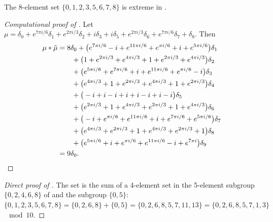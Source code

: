 


\begin{prop}\label{prop8in10} The 8-element set
$\{0,1,2,3,5,6,7,8\}$ is extreme in . %
\end{prop}


\begin{proof}[Computational proof of ] 
Let $\mu=\delta_{0}  +   e^{ 7\pi i  / 6}\delta_{1}  +   e^{ 2\pi i  / 3}\delta_{2}  +    i \delta_{3}  +    i \delta_{5}  +   e^{ 2\pi i  / 3}\delta_{6}  +   e^{ 7\pi i  / 6}\delta_{7}  +  \delta_{8} $.
Then
\begin{align*}  
\mu*\tilde\mu &=   8\delta_{0}  +  \big( e^{ 7 \pi i / 6}- i+ e^{ 11 \pi i / 6}+ e^{\pi i / 6}+  i + e^{ 5 \pi i / 6}\big)\delta_{1} 
\\& \qquad +  \big( 1+ e^{ 2 \pi i / 3}+ e^{ 4 \pi i / 3}+ 1+ e^{ 2 \pi i / 3}+ e^{ 4 \pi i / 3}\big)\delta_{2} 
\\& \qquad +  \big( e^{ 5 \pi i / 6}+ e^{ 7 \pi i / 6}+  i + e^{ 11 \pi i / 6}+ e^{\pi i / 6}- i\big)\delta_{3} 
\\& \qquad +  \big( e^{ 4 \pi i / 3}+ 1+ e^{ 2 \pi i / 3}+ e^{ 4 \pi i / 3}+ 1+ e^{ 2 \pi i / 3}\big)\delta_{4} 
\\& \qquad +  \big( -i +  i - i+  i +  i - i+  i - i\big)\delta_{5} 
\\& \qquad +  \big( e^{ 2 \pi i / 3}+ 1+ e^{ 4 \pi i / 3}+ e^{ 2 \pi i / 3}+ 1+ e^{ 4 \pi i / 3}\big)\delta_{6} 
\\& \qquad +  \big( -i + e^{\pi i / 6}+ e^{ 11 \pi i / 6}+  i + e^{ 7 \pi i / 6}+ e^{ 5 \pi i / 6}\big)\delta_{7} 
\\& \qquad +  \big( e^{ 4 \pi i / 3}+ e^{ 2 \pi i / 3}+ 1+ e^{ 4 \pi i / 3}+ e^{ 2 \pi i / 3}+ 1\big)\delta_{8} 
\\& \qquad +  \big( e^{ 5 \pi i / 6}+  i + e^{\pi i / 6}+ e^{ 11 \pi i / 6}- i+ e^{ 7 \pi i }\big)\delta_{9}
\\&=9\delta_0.\qedhere
\end{align*}
\end{proof}


\begin{proof}[Direct proof of ] The set is the sum of a 4-element set in the 5-element
subgroup $\{0,2,4,6,8\}$ of  and the subgroup $\{0,5\}$:
$\{0,1,2,3,5,6,7,8\} = \{0,2,6,8\}+\{0,5\}=\{0,2,6,8,5,7,11,13\} = \{0,2,6,8,5,7,1,3\}$ $\mod 10$.
\end{proof}

